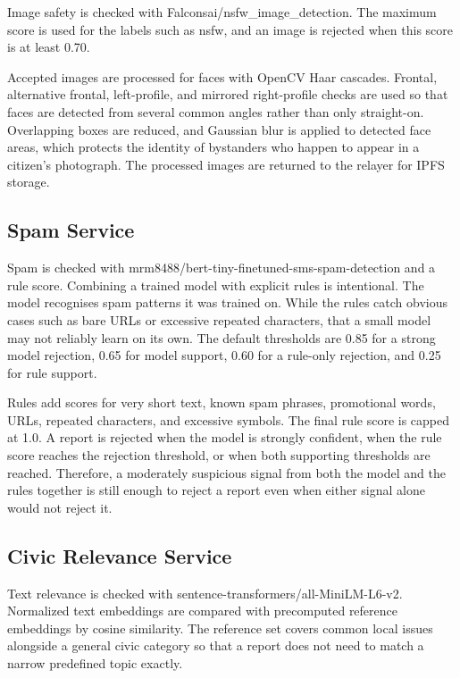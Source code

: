 Image safety is checked with Falconsai/nsfw\_image\_detection. The maximum score is used for the labels such as nsfw, and an image is rejected when this score is at least 0.70.

Accepted images are processed for faces with OpenCV Haar cascades. Frontal, alternative frontal, left-profile, and mirrored right-profile checks are used so that faces are detected from several common angles rather than only straight-on. Overlapping boxes are reduced, and Gaussian blur is applied to detected face areas, which protects the identity of bystanders who happen to appear in a citizen's photograph. The processed images are returned to the relayer for IPFS storage.

\subsection{Spam Service}
\label{subsec:spam-service}

Spam is checked with mrm8488/bert-tiny-finetuned-sms-spam-detection and a rule score. Combining a trained model with explicit rules is intentional. The model recognises spam patterns it was trained on. While the rules catch obvious cases such as bare URLs or excessive repeated characters, that a small model may not reliably learn on its own. The default thresholds are 0.85 for a strong model rejection, 0.65 for model support, 0.60 for a rule-only rejection, and 0.25 for rule support.

Rules add scores for very short text, known spam phrases, promotional words, URLs, repeated characters, and excessive symbols. The final rule score is capped at 1.0. A report is rejected when the model is strongly confident, when the rule score reaches the rejection threshold, or when both supporting thresholds are reached. Therefore, a moderately suspicious signal from both the model and the rules together is still enough to reject a report even when either signal alone would not reject it.

\subsection{Civic Relevance Service}
\label{subsec:civic-service}

Text relevance is checked with sentence-transformers/all-MiniLM-L6-v2. Normalized text embeddings are compared with precomputed reference embeddings by cosine similarity. The reference set covers common local issues alongside a general civic category so that a report does not need to match a narrow predefined topic exactly.

